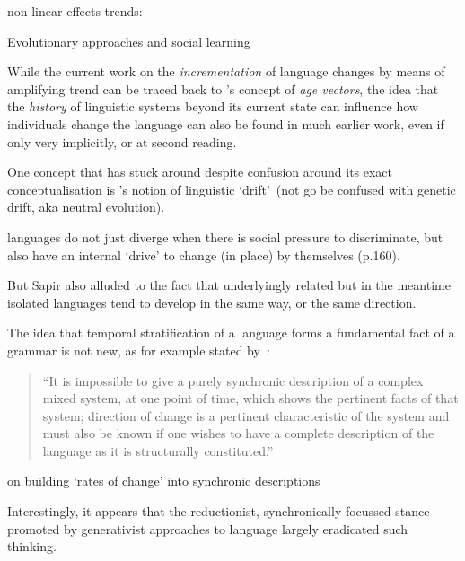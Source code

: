 non-linear effects
trends: \citep{Bikhchandani1992,Bikhchandani1998}

Evolutionary approaches and social learning

\citep{Altmann2013,Acerbi2014}

While the current work on the \emph{incrementation} of language changes by means of amplifying trend can be traced back to \citet[ch.14]{Labov2001}'s concept of \emph{age vectors}, the idea that the \emph{history} of linguistic systems beyond its current state can influence how individuals change the language can also be found in much earlier work, even if only very implicitly, or at second reading.

One concept that has stuck around despite confusion around its exact conceptualisation %
is \citet{Sapir1921}'s notion of linguistic `drift'~(not go be confused with genetic drift, aka neutral evolution). 

 languages do not just diverge when there is social pressure to discriminate, but also have an internal `drive' to change (in place) by themselves (p.160).

But Sapir also alluded to the fact that underlyingly related but in the meantime isolated languages tend to develop in the same way, or the same direction. 

The idea that temporal stratification of a language forms a fundamental fact of a grammar is not new, as for example stated by~\citet[p.42]{Fries1949}:
\begin{quote}
``It is impossible to give a purely synchronic description of a complex mixed system, at one point of time, which shows the pertinent facts of that system; direction of change is a pertinent characteristic of the system and must also be known if one wishes to have a complete description of the language as it is structurally constituted.''
\end{quote}

\citep{Bailey1970} on building `rates of change' into synchronic descriptions

Interestingly, it appears that the reductionist, synchronically-focussed stance promoted by generativist approaches to language largely eradicated such thinking.

